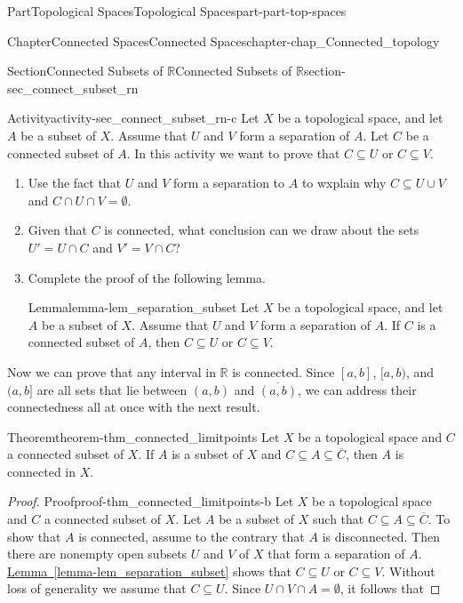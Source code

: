 \documentclass[oneside,10pt,]{book}
\newcommand{\xreffont}{\relax}
\numberwithin{equation}{chapter}
\newcommand{\R}{\mathbb{R}}
\begin{document}
\begin{partptx}{Part}{Topological Spaces}{}{Topological Spaces}{}{}{part-part-top-spaces}
\begin{chapterptx}{Chapter}{Connected Spaces}{}{Connected Spaces}{}{}{chapter-chap_Connected_topology}
\begin{sectionptx}{Section}{Connected Subsets of \(\R\)}{}{Connected Subsets of \(\R\)}{}{}{section-sec_connect_subset_rn}
\begin{activity}{Activity}{}{activity-sec_connect_subset_rn-c}%
Let \(X\) be a topological space, and let \(A\) be a subset of \(X\). Assume that \(U\) and \(V\) form a separation of \(A\). Let \(C\) be a connected subset of \(A\). In this activity we want to prove that \(C \subseteq U\) or \(C \subseteq V\).%
\begin{enumerate}[font=\bfseries,label=(\alph*),ref=\alph*]%
\item{}Use the fact that \(U\) and \(V\) form a separation to \(A\) to wxplain why \(C \subseteq U \cup V\) and \(C \cap U \cap V = \emptyset\).%
\item{}Given that \(C\) is connected, what conclusion can we draw about the sets \(U' = U \cap C\) and \(V' = V \cap C\)?%
\item{}Complete the proof of the following lemma.%
\begin{lemma}{Lemma}{}{}{lemma-lem_separation_subset}%
Let \(X\) be a topological space, and let \(A\) be a subset of \(X\). Assume that \(U\) and \(V\) form a separation of \(A\). If \(C\) is a connected subset of \(A\), then \(C \subseteq U\) or \(C \subseteq V\).%
\end{lemma}
\end{enumerate}%
\end{activity}%
Now we can prove that any interval in \(\R\) is connected. Since \([a,b]\), \([a,b)\), and \((a,b]\) are all sets that lie between \((a,b)\) and \(\overline{(a,b)}\), we can address their connectedness all at once with the next result.%
\begin{theorem}{Theorem}{}{}{theorem-thm_connected_limitpoints}%
Let \(X\) be a topological space and \(C\) a connected subset of \(X\). If \(A\) is a subset of \(X\) and \(C \subseteq A \subseteq \overline{C}\), then \(A\) is connected in \(X\).%
\end{theorem}
\begin{proof}{Proof}{}{proof-thm_connected_limitpoints-b}
Let \(X\) be a topological space and \(C\) a connected subset of \(X\). Let \(A\) be a subset of \(X\) such that \(C \subseteq A \subseteq \overline{C}\). To show that \(A\) is connected, assume to the contrary that \(A\) is disconnected. Then there are nonempty open subsets \(U\) and \(V\) of \(X\) that form a separation of \(A\). \hyperref[lemma-lem_separation_subset]{Lemma~{\xreffont\ref{lemma-lem_separation_subset}}} shows that \(C \subseteq U\) or \(C \subseteq V\). Without loss of generality we assume that \(C \subseteq U\). Since \(U \cap V \cap A = \emptyset\), it follows that%

\end{proof}
\end{sectionptx}
\end{chapterptx}
\end{partptx}
\end{document}
